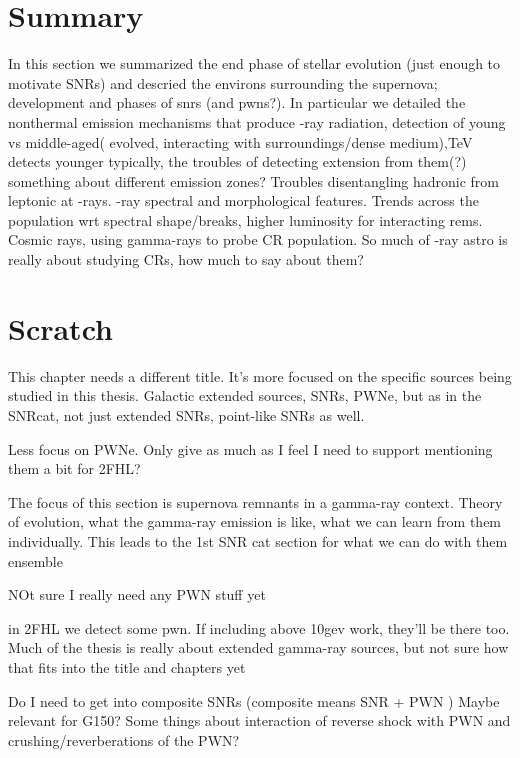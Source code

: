 \section{Summary}\label{Rems:summ} In this section we summarized the end phase of stellar evolution (just enough to motivate SNRs) and descried the environs surrounding the supernova; development and phases of \glspl{snr} (and \glspl{pwn}?).  In particular we detailed the nonthermal emission mechanisms that produce \g-ray radiation, detection of young vs middle-aged( evolved, interacting with surroundings/dense medium),TeV detects younger typically, the troubles of detecting extension from them(?) something about different emission zones? Troubles disentangling hadronic from leptonic at \g-rays. \g-ray spectral and morphological features. Trends across the population wrt spectral shape/breaks, higher luminosity for interacting rems. Cosmic rays, using gamma-rays to probe CR population. So much of \g-ray astro is really about studying CRs, how much to say about them? 

\section{Scratch}
This chapter needs a different title. It's more focused on the specific sources being studied in this thesis. Galactic extended sources, SNRs, PWNe, but as in the SNRcat, not just extended SNRs, point-like SNRs as well.

Less focus on PWNe. Only give as much as I feel I need to support mentioning them a bit for 2FHL?

The focus of this section is supernova remnants in a gamma-ray context. Theory of evolution, what the gamma-ray emission is like, what we can learn from them individually.  This leads to the 1st SNR cat section for what we can do with them ensemble

NOt sure I really need any PWN stuff yet

in 2FHL we detect some pwn. If including above 10gev work, they'll be there too. Much of the thesis is really about extended gamma-ray sources, but not sure how that fits into the title and chapters yet

Do I need to get into composite SNRs (composite means SNR + PWN ) Maybe relevant for G150? Some things about interaction of reverse shock with PWN and crushing/reverberations of the PWN?

\cite{Montmerle79}